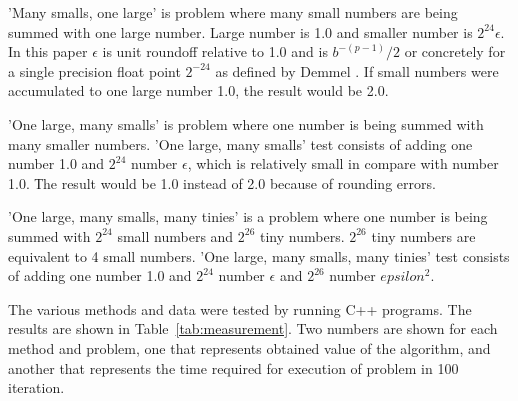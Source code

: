 \documentclass[conference]{IEEEtran}
\begin{document}
\par
'Many smalls, one large' is problem where many small numbers 
are being summed with one large number. 
Large number is 1.0 and smaller number is $2^{24} \epsilon$.
In this paper $\epsilon$ is unit roundoff relative to 1.0 and 
is $b^{-(p-1)}/2$ or concretely for a single precision float point 
$2^{-24}$ as defined by Demmel \cite{DemmelsEpsilon}.
If small numbers were accumulated to one large number 1.0, the result would be 2.0.
\par
'One large, many smalls' is problem where one number 
is being summed with many smaller numbers. 'One large, many smalls' 
test consists of adding one number 1.0 and $2^{24}$ number $\epsilon$, 
which is relatively small in compare with number 1.0.
Тhe result would be 1.0 instead of 2.0 because of rounding errors.
\par
'One large, many smalls, many tinies' is a problem where one 
number is being summed with $2^{24}$ small numbers and $2^{26}$
tiny numbers. $2^{26}$ tiny numbers are equivalent to 4 small numbers.
'One large, many smalls, many tinies' test consists of adding 
one number 1.0 and $2^{24}$ number $\epsilon$ and $2^{26}$ number 
$epsilon^2$.
\par
The various methods and data were tested by running C++ programs.
The results are shown in Table~\ref{tab:measurement}. 
Two numbers are shown for each method and problem, 
one that represents obtained value of the algorithm,
and another that represents the time required for execution of problem in 100 iteration.
\end{document}
